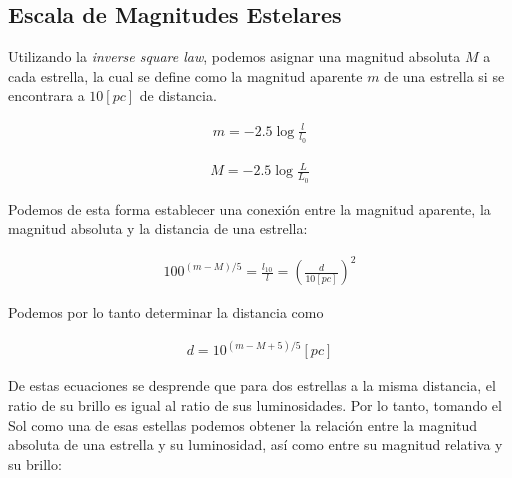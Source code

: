\documentclass{tufte-handout}
\begin{document}
\subsection{Escala de Magnitudes Estelares}

Utilizando la \emph{inverse square law}, podemos asignar una magnitud absoluta $M$ a cada estrella, la cual se define como la magnitud aparente $m$ de una estrella si se encontrara a $10 [pc]$ de distancia.


\begin{align}
  m = -2.5 \log{\frac{l}{l_0}}
\end{align}

\begin{align}
  M = -2.5 \log{\frac{L}{L_0}}
\end{align}

Podemos de esta forma establecer una conexión entre la magnitud aparente, la magnitud absoluta y la distancia de una estrella:

\begin{align}
  100^{(m - M)/5} = \frac{l_{10}}{l} = (\frac{d}{10 [pc]})^2
\end{align}

Podemos por lo tanto determinar la distancia como

\begin{align}
  d = 10^{(m - M + 5)/5} [pc]
\end{align}


De estas ecuaciones se desprende que para dos estrellas a la misma distancia, el ratio de su brillo es igual al ratio de sus luminosidades. Por lo tanto, tomando el Sol como una de esas estellas podemos obtener la relación entre la magnitud absoluta de una estrella y su luminosidad, así como entre su magnitud relativa y su brillo:
\end{document}
